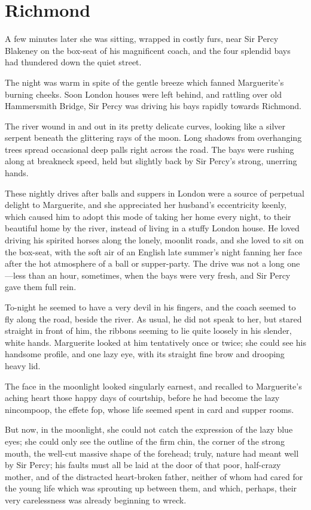 
\chapter{Richmond}
\lettrine[lines=4]{A}{} few minutes later she was sitting, wrapped in costly furs, near Sir Percy Blakeney on the box-seat of his magnificent coach, and the four splendid bays had thundered down the quiet street.

The night was warm in spite of the gentle breeze which fanned Marguerite's burning cheeks. Soon London houses were left behind, and rattling over old Hammersmith  Bridge, Sir Percy was driving his bays rapidly towards Richmond.

The river wound in and out in its pretty delicate curves, looking like a silver serpent beneath the glittering rays of the moon. Long shadows from overhanging trees spread occasional deep palls right across the road. The bays were rushing along at breakneck speed, held but slightly back by Sir Percy's strong, unerring hands.

These nightly drives after balls and suppers in London were a source of perpetual delight to Marguerite, and she appreciated her husband's eccentricity keenly, which caused him to adopt this mode of taking her home every night, to their beautiful home by the river, instead of living in a stuffy London house. He loved driving his spirited horses along the lonely, moonlit roads, and she loved to sit on the box-seat, with the soft air of an English late summer's night fanning her face after the hot atmosphere of a ball or supper-party. The drive was not a long one—less than an hour, sometimes, when the bays were very fresh, and Sir Percy gave them full rein.

To-night he seemed to have a very devil in his fingers, and the coach seemed to fly along the road, beside the river. As usual, he did not speak to her, but stared straight in front of him, the ribbons seeming to lie quite loosely in his slender, white hands. Marguerite looked at him tentatively once or twice; she could see his handsome profile, and one lazy eye, with its straight fine brow and drooping heavy lid.

The face in the moonlight looked singularly earnest, and recalled to Marguerite's aching heart those happy days of courtship, before he had become the lazy nincompoop, the effete fop, whose life seemed spent in card and supper rooms.

But now, in the moonlight, she could not catch the expression of the lazy blue eyes; she could only see the outline of the firm chin, the corner of the strong mouth, the well-cut massive shape of the forehead; truly, nature had meant well by Sir Percy; his faults must all be laid at the door of that poor, half-crazy mother, and of the distracted heart-broken father, neither of whom had cared for the young life which was sprouting up between them, and which, perhaps, their very carelessness was already beginning to wreck.

